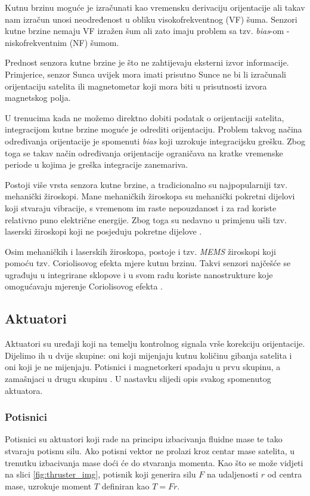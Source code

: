 \documentclass[times, utf8, diplomski, numeric]{templates/template}
\begin{document}
{{{            Kutnu brzinu moguće je izračunati kao vremensku derivaciju orijentacije ali takav nam izračun unosi neodređenost u obliku visokofrekventnog (VF) šuma. Senzori kutne brzine nemaju VF izražen šum ali zato imaju problem sa tzv. \emph{bias}-om - niskofrekventnim (NF) šumom. 

            Prednost senzora kutne brzine je što ne zahtijevaju eksterni izvor informacije. Primjerice, senzor Sunca uvijek mora imati prisutno Sunce ne bi li izračunali orijentaciju satelita ili magnetometar koji mora biti u prisutnosti izvora magnetskog polja. 

            U trenucima kada ne možemo direktno dobiti podatak o orijentaciji satelita, integracijom kutne brzine moguće je odrediti orijentaciju. Problem takvog načina određivanja orijentacije je spomenuti \emph{bias} koji uzrokuje integracijsku grešku. Zbog toga se takav način određivanja orijentacije ograničava na kratke vremenske periode u kojima je greška integracije zanemariva.

            Postoji više vrsta senzora kutne brzine, a tradicionalno su najpopularniji tzv. mehanički žiroskopi. Mane mehaničkih žiroskopa su mehanički pokretni dijelovi koji stvaraju vibracije, s vremenom im raste nepouzdanost i za rad koriste relativno puno električne energije. Zbog toga su nedavno u primjenu ušli tzv. laserski žiroskopi koji ne posjeduju pokretne dijelove \cite{adcsKnjiga}. 

            Osim mehaničkih i laserskih žiroskopa, postoje i tzv. \emph{MEMS} žiroskopi koji pomoću tzv. Coriolisovog efekta mjere kutnu brzinu. Takvi senzori najčešće se ugrađuju u integrirane sklopove i u svom radu koriste nanostrukture koje omogućavaju mjerenje Coriolisovog efekta \cite{memsGyro}.
        }


        \subsection{Aktuatori}{
            Aktuatori su uređaji koji na temelju kontrolnog signala vrše korekciju orijentacije. Dijelimo ih u dvije skupine: oni koji mijenjaju kutnu količinu gibanja satelita i oni koji je ne mijenjaju. Potisnici i magnetorkeri spadaju u prvu skupinu, a zamašnjaci u drugu skupinu \cite{adcsKnjiga}. U nastavku slijedi opis svakog spomenutog aktuatora. 

            \subsubsection{Potisnici }{
                Potisnici su aktuatori koji rade na principu izbacivanja fluidne mase te tako stvaraju potisnu silu. Ako potisni vektor ne prolazi kroz centar mase satelita, u trenutku izbacivanja mase doći će do stvaranja momenta. Kao što se može vidjeti na slici \ref{fig:thruster_img}, potisnik koji generira silu $F$ na udaljenosti $r$ od centra mase, uzrokuje moment $T$ definiran kao $T=Fr$.

}}}}
\end{document}

